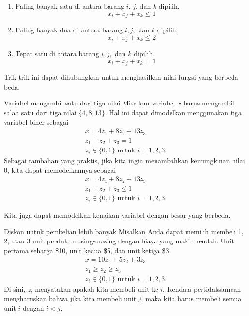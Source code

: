 \begin{enumerate}
\item Paling banyak satu di antara barang $i$, $j$, dan $k$ dipilih.
 \begin{equation}
 x_i + x_j + x_k \leq 1
 \end{equation}
\item Paling banyak dua di antara barang $i,j,$ dan $k$ dipilih.
 \begin{equation}
 x_i + x_j + x_k \leq 2
 \end{equation}
\item Tepat satu di antara barang $i,j,$ dan $k$ dipilih.
 \begin{equation}
  x_i + x_j + x_k = 1
 \end{equation}
\end{enumerate}

Trik-trik ini dapat dihubungkan untuk menghasilkan nilai fungsi yang berbeda-beda.

\begin{example}{Variabel mengambil satu dari tiga nilai}{}
Misalkan variabel $x$ harus mengambil salah satu dari tiga nilai $\{4, 8, 13\}$. Hal ini dapat dimodelkan menggunakan tiga variabel biner sebagai
\begin{align*}
x=4z_1 +8z_2 +13z_3\\
 z_1 +z_2 +z_3 =1\\
z_i \in \{0, 1\} \text{ untuk } i = 1, 2,3.
\end{align*}
Sebagai tambahan yang praktis, jika kita ingin menambahkan kemungkinan nilai $0$, kita dapat memodelkannya sebagai
\begin{align*}
x=4z_1 +8z_2 +13z_3\\
 z_1 +z_2 +z_3 \leq 1\\
z_i \in \{0, 1\} \text{ untuk } i = 1, 2,3.
\end{align*}
\end{example}


Kita juga dapat memodelkan kenaikan variabel dengan besar yang berbeda. \begin{example}{Diskon untuk pembelian lebih banyak}{}
Misalkan Anda dapat memilih membeli 1, 2, atau 3 unit produk, masing-masing dengan biaya yang makin rendah. Unit pertama seharga \$10, unit kedua \$5, dan unit ketiga \$3.
\begin{align*}
x=10z_1 +5z_2 +3z_3\\
 z_1\geq z_2 \geq z_3\\
z_i \in \{0, 1\} \text{ untuk } i = 1, 2,3.
\end{align*}
Di sini, $z_i$ menyatakan apakah kita membeli unit ke-$i$. Kendala pertidaksamaan mengharuskan bahwa jika kita membeli unit $j$, maka kita harus membeli semua unit $i$ dengan $i < j$.
\end{example}


